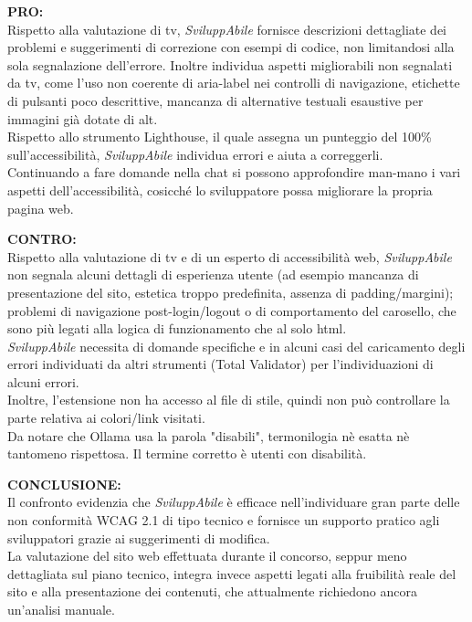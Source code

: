 \vspace{0.5cm}
\noindent \textbf{PRO:}\\
\noindent Rispetto alla valutazione di \acrshort{tv}, \textit{SviluppAbile} fornisce descrizioni dettagliate dei problemi e suggerimenti di correzione con esempi di codice, non limitandosi alla sola segnalazione dell’errore. Inoltre individua aspetti migliorabili non segnalati da \acrshort{tv}, come l’uso non coerente di aria-label nei controlli di navigazione, etichette di pulsanti poco descrittive, mancanza di alternative testuali esaustive per immagini già dotate di alt.\\
Rispetto allo strumento Lighthouse, il quale assegna un punteggio del 100\% sull'accessibilità, \textit{SviluppAbile} individua errori e aiuta a correggerli.\\
Continuando a fare domande nella chat si possono approfondire man-mano i vari aspetti dell’accessibilità, cosicché lo sviluppatore possa migliorare la propria pagina web.

\vspace{0.5cm}
\noindent \textbf{CONTRO:}\\
\noindent Rispetto alla valutazione di \acrshort{tv} e di un esperto di accessibilità web, \textit{SviluppAbile} non segnala alcuni dettagli di esperienza utente (ad esempio mancanza di presentazione del sito, estetica troppo predefinita, assenza di padding/margini); problemi di navigazione post-login/logout o di comportamento del carosello, che sono più legati alla logica di funzionamento che al solo \acrshort{html}.\\
\textit{SviluppAbile} necessita di domande specifiche e in alcuni casi del caricamento degli errori individuati da altri strumenti (Total Validator) per l’individuazioni di alcuni errori.\\
Inoltre, l'estensione non ha accesso al file di stile, quindi non può controllare la parte relativa ai colori/link visitati.\\
Da notare che Ollama usa la parola "disabili", termonilogia nè esatta nè tantomeno rispettosa. Il termine corretto è utenti con disabilità.

\vspace{0.5cm}
\noindent \textbf{CONCLUSIONE:}\\
\noindent Il confronto evidenzia che \textit{SviluppAbile} è efficace nell’individuare gran parte delle non conformità WCAG 2.1 di tipo tecnico e fornisce un supporto pratico agli sviluppatori grazie ai suggerimenti di modifica.\\
La valutazione del sito web effettuata durante il concorso, seppur meno dettagliata sul piano tecnico, integra invece aspetti legati alla fruibilità reale del sito e alla presentazione dei contenuti, che attualmente richiedono ancora un’analisi manuale.

